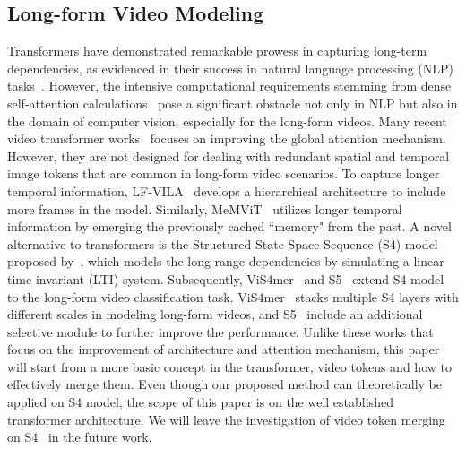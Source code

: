 \documentclass{article}
\begin{document}
\subsection{Long-form Video Modeling} 
\vspace*{-0.2cm}
Transformers have demonstrated remarkable prowess in capturing long-term dependencies, as evidenced in their success in natural language processing (NLP) tasks~\citep{brown2020language,dai2019transformer,devlin2018bert}. However, the intensive computational requirements stemming from dense self-attention calculations~\citep{vaswani2017attention} pose a significant obstacle not only in NLP but also in the domain of computer vision, especially for the long-form videos. Many recent video transformer works~\citep{wang2022deformable, liu2021swin,bertasius2021space} focuses on improving the global attention mechanism. However, they are not designed for dealing with redundant spatial and temporal image tokens that are common in long-form video scenarios. To capture longer temporal information, LF-VILA~\citep{sunlong2022} develops a hierarchical architecture to include more frames in the model. Similarly, MeMViT~\citep{wu2022memvit} utilizes longer temporal information by emerging the previously cached ``memory" from the past. A novel alternative to transformers is the Structured State-Space Sequence (S4) model proposed by~\citet{gu2021efficiently}, which models the long-range dependencies by simulating a linear time invariant (LTI) system. Subsequently, ViS4mer~\citep{islam2022vis4mer} and S5~\citep{wang2023s5} extend S4 model to the long-form video classification task. ViS4mer~\citep{islam2022vis4mer} stacks multiple S4 layers with different scales in modeling long-form videos, and S5~\citep{wang2023s5} include an additional selective module to further improve the performance. Unlike these works that focus on the improvement of architecture and attention mechanism, this paper will start from a more basic concept in the transformer, video tokens and how to effectively merge them. Even though our proposed method can theoretically be applied on S4 model, the scope of this paper is on the well established transformer architecture. We will leave the investigation of video token merging on S4~\citep{gu2021efficiently} in the future work.

\vspace*{-0.2cm}
\end{document}
